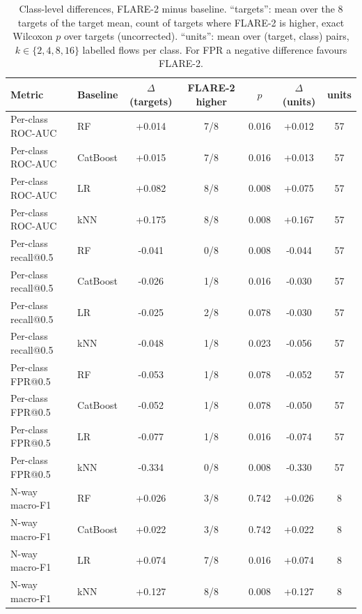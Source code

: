 \documentclass[pdflatex,sn-mathphys-num]{sn-jnl}%
\begin{document}
\begin{table}[htbp]
\centering\scriptsize
\caption{Class-level differences, FLARE-2 minus baseline. ``targets'': mean over the 8 targets of the target mean, count of targets where FLARE-2 is higher, exact Wilcoxon $p$ over targets (uncorrected). ``units'': mean over (target, class) pairs, $k\in\{2,4,8,16\}$ labelled flows per class. For FPR a negative difference favours FLARE-2.}\label{tab:class}
{\scriptsize\setlength{\tabcolsep}{2.5pt}\begin{tabular}{llccccc}
\toprule
Metric & Baseline & $\Delta$ (targets) & FLARE-2 higher & $p$ & $\Delta$ (units) & units \\
\midrule
Per-class ROC-AUC & RF & +0.014 & 7/8 & 0.016 & +0.012 & 57 \\
Per-class ROC-AUC & CatBoost & +0.015 & 7/8 & 0.016 & +0.013 & 57 \\
Per-class ROC-AUC & LR & +0.082 & 8/8 & 0.008 & +0.075 & 57 \\
Per-class ROC-AUC & kNN & +0.175 & 8/8 & 0.008 & +0.167 & 57 \\
Per-class recall@0.5 & RF & -0.041 & 0/8 & 0.008 & -0.044 & 57 \\
Per-class recall@0.5 & CatBoost & -0.026 & 1/8 & 0.016 & -0.030 & 57 \\
Per-class recall@0.5 & LR & -0.025 & 2/8 & 0.078 & -0.030 & 57 \\
Per-class recall@0.5 & kNN & -0.048 & 1/8 & 0.023 & -0.056 & 57 \\
Per-class FPR@0.5 & RF & -0.053 & 1/8 & 0.078 & -0.052 & 57 \\
Per-class FPR@0.5 & CatBoost & -0.052 & 1/8 & 0.078 & -0.050 & 57 \\
Per-class FPR@0.5 & LR & -0.077 & 1/8 & 0.016 & -0.074 & 57 \\
Per-class FPR@0.5 & kNN & -0.334 & 0/8 & 0.008 & -0.330 & 57 \\
N-way macro-F1 & RF & +0.026 & 3/8 & 0.742 & +0.026 & 8 \\
N-way macro-F1 & CatBoost & +0.022 & 3/8 & 0.742 & +0.022 & 8 \\
N-way macro-F1 & LR & +0.074 & 7/8 & 0.016 & +0.074 & 8 \\
N-way macro-F1 & kNN & +0.127 & 8/8 & 0.008 & +0.127 & 8 \\
\bottomrule
\end{tabular}}
\end{table}
\end{document}

